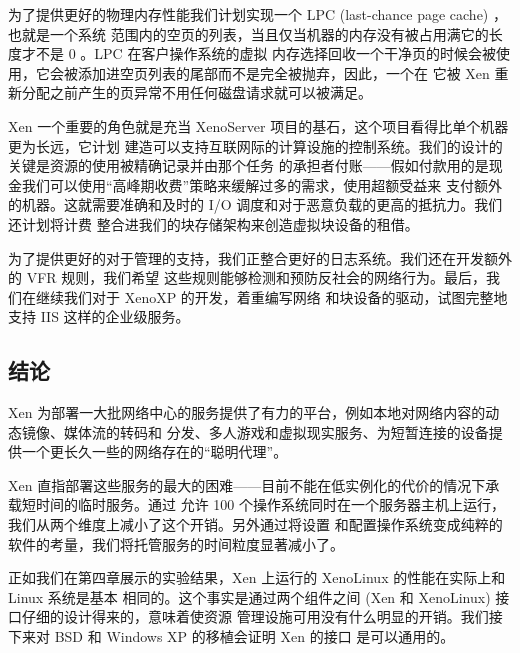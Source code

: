 为了提供更好的物理内存性能我们计划实现一个 LPC (last-chance page cache) ，也就是一个系统
范围内的空页的列表，当且仅当机器的内存没有被占用满它的长度才不是 0 。LPC 在客户操作系统的虚拟
内存选择回收一个干净页的时候会被使用，它会被添加进空页列表的尾部而不是完全被抛弃，因此，一个在
它被 Xen 重新分配之前产生的页异常不用任何磁盘请求就可以被满足。

Xen 一个重要的角色就是充当 XenoServer 项目的基石，这个项目看得比单个机器更为长远，它计划
建造可以支持互联网际的计算设施的控制系统。我们的设计的关键是资源的使用被精确记录并由那个任务
的承担者付账——假如付款用的是现金我们可以使用“高峰期收费”策略来缓解过多的需求，使用超额受益来
支付额外的机器。这就需要准确和及时的 I/O 调度和对于恶意负载的更高的抵抗力。我们还计划将计费
整合进我们的块存储架构来创造虚拟块设备的租借。

为了提供更好的对于管理的支持，我们正整合更好的日志系统。我们还在开发额外的 VFR 规则，我们希望
这些规则能够检测和预防反社会的网络行为。最后，我们在继续我们对于 XenoXP 的开发，着重编写网络
和块设备的驱动，试图完整地支持 IIS 这样的企业级服务。

\subsection{结论}

Xen 为部署一大批网络中心的服务提供了有力的平台，例如本地对网络内容的动态镜像、媒体流的转码和
分发、多人游戏和虚拟现实服务、为短暂连接的设备提供一个更长久一些的网络存在的“聪明代理”。

Xen 直指部署这些服务的最大的困难——目前不能在低实例化的代价的情况下承载短时间的临时服务。通过
允许 100 个操作系统同时在一个服务器主机上运行，我们从两个维度上减小了这个开销。另外通过将设置
和配置操作系统变成纯粹的软件的考量，我们将托管服务的时间粒度显著减小了。

正如我们在第四章展示的实验结果，Xen 上运行的 XenoLinux 的性能在实际上和 Linux 系统是基本
相同的。这个事实是通过两个组件之间 (Xen 和 XenoLinux) 接口仔细的设计得来的，意味着使资源
管理设施可用没有什么明显的开销。我们接下来对 BSD 和 Windows XP 的移植会证明 Xen 的接口
是可以通用的。
